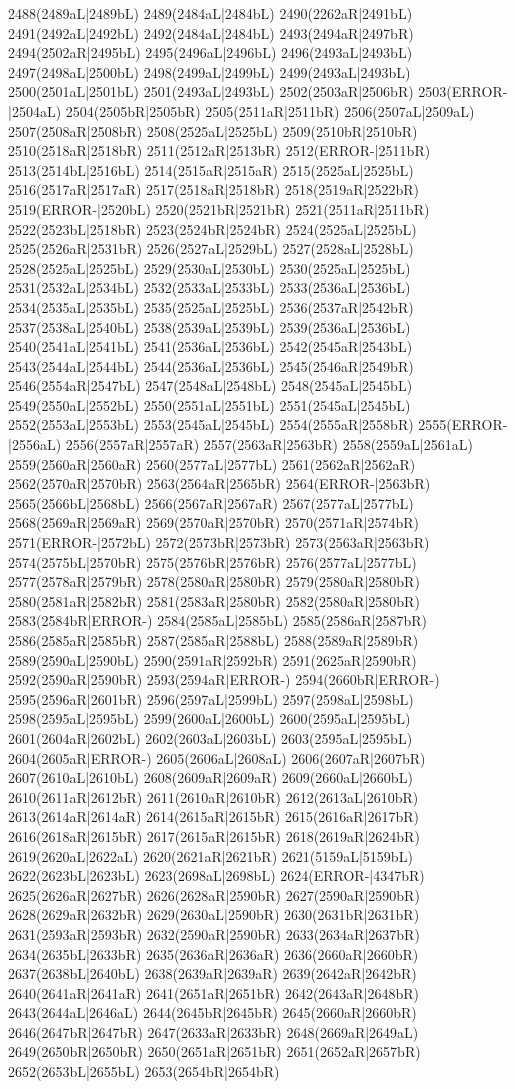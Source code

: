 2488(2489aL|2489bL) 2489(2484aL|2484bL) 2490(2262aR|2491bL) 2491(2492aL|2492bL) 2492(2484aL|2484bL) 2493(2494aR|2497bR) 2494(2502aR|2495bL) 2495(2496aL|2496bL) 2496(2493aL|2493bL) 2497(2498aL|2500bL) 2498(2499aL|2499bL) 2499(2493aL|2493bL) 2500(2501aL|2501bL) 2501(2493aL|2493bL) 2502(2503aR|2506bR) 2503(ERROR-|2504aL) 2504(2505bR|2505bR) 2505(2511aR|2511bR) 2506(2507aL|2509aL) 2507(2508aR|2508bR) 2508(2525aL|2525bL) 2509(2510bR|2510bR) 2510(2518aR|2518bR) 2511(2512aR|2513bR) 2512(ERROR-|2511bR) 2513(2514bL|2516bL) 2514(2515aR|2515aR) 2515(2525aL|2525bL) 2516(2517aR|2517aR) 2517(2518aR|2518bR) 2518(2519aR|2522bR) 2519(ERROR-|2520bL) 2520(2521bR|2521bR) 2521(2511aR|2511bR) 2522(2523bL|2518bR) 2523(2524bR|2524bR) 2524(2525aL|2525bL) 2525(2526aR|2531bR) 2526(2527aL|2529bL) 2527(2528aL|2528bL) 2528(2525aL|2525bL) 2529(2530aL|2530bL) 2530(2525aL|2525bL) 2531(2532aL|2534bL) 2532(2533aL|2533bL) 2533(2536aL|2536bL) 2534(2535aL|2535bL) 2535(2525aL|2525bL) 2536(2537aR|2542bR) 2537(2538aL|2540bL) 2538(2539aL|2539bL) 2539(2536aL|2536bL) 2540(2541aL|2541bL) 2541(2536aL|2536bL) 2542(2545aR|2543bL) 2543(2544aL|2544bL) 2544(2536aL|2536bL) 2545(2546aR|2549bR) 2546(2554aR|2547bL) 2547(2548aL|2548bL) 2548(2545aL|2545bL) 2549(2550aL|2552bL) 2550(2551aL|2551bL) 2551(2545aL|2545bL) 2552(2553aL|2553bL) 2553(2545aL|2545bL) 2554(2555aR|2558bR) 2555(ERROR-|2556aL) 2556(2557aR|2557aR) 2557(2563aR|2563bR) 2558(2559aL|2561aL) 2559(2560aR|2560aR) 2560(2577aL|2577bL) 2561(2562aR|2562aR) 2562(2570aR|2570bR) 2563(2564aR|2565bR) 2564(ERROR-|2563bR) 2565(2566bL|2568bL) 2566(2567aR|2567aR) 2567(2577aL|2577bL) 2568(2569aR|2569aR) 2569(2570aR|2570bR) 2570(2571aR|2574bR) 2571(ERROR-|2572bL) 2572(2573bR|2573bR) 2573(2563aR|2563bR) 2574(2575bL|2570bR) 2575(2576bR|2576bR) 2576(2577aL|2577bL) 2577(2578aR|2579bR) 2578(2580aR|2580bR) 2579(2580aR|2580bR) 2580(2581aR|2582bR) 2581(2583aR|2580bR) 2582(2580aR|2580bR) 2583(2584bR|ERROR-) 2584(2585aL|2585bL) 2585(2586aR|2587bR) 2586(2585aR|2585bR) 2587(2585aR|2588bL) 2588(2589aR|2589bR) 2589(2590aL|2590bL) 2590(2591aR|2592bR) 2591(2625aR|2590bR) 2592(2590aR|2590bR) 2593(2594aR|ERROR-) 2594(2660bR|ERROR-) 2595(2596aR|2601bR) 2596(2597aL|2599bL) 2597(2598aL|2598bL) 2598(2595aL|2595bL) 2599(2600aL|2600bL) 2600(2595aL|2595bL) 2601(2604aR|2602bL) 2602(2603aL|2603bL) 2603(2595aL|2595bL) 2604(2605aR|ERROR-) 2605(2606aL|2608aL) 2606(2607aR|2607bR) 2607(2610aL|2610bL) 2608(2609aR|2609aR) 2609(2660aL|2660bL) 2610(2611aR|2612bR) 2611(2610aR|2610bR) 2612(2613aL|2610bR) 2613(2614aR|2614aR) 2614(2615aR|2615bR) 2615(2616aR|2617bR) 2616(2618aR|2615bR) 2617(2615aR|2615bR) 2618(2619aR|2624bR) 2619(2620aL|2622aL) 2620(2621aR|2621bR) 2621(5159aL|5159bL) 2622(2623bL|2623bL) 2623(2698aL|2698bL) 2624(ERROR-|4347bR) 2625(2626aR|2627bR) 2626(2628aR|2590bR) 2627(2590aR|2590bR) 2628(2629aR|2632bR) 2629(2630aL|2590bR) 2630(2631bR|2631bR) 2631(2593aR|2593bR) 2632(2590aR|2590bR) 2633(2634aR|2637bR) 2634(2635bL|2633bR) 2635(2636aR|2636aR) 2636(2660aR|2660bR) 2637(2638bL|2640bL) 2638(2639aR|2639aR) 2639(2642aR|2642bR) 2640(2641aR|2641aR) 2641(2651aR|2651bR) 2642(2643aR|2648bR) 2643(2644aL|2646aL) 2644(2645bR|2645bR) 2645(2660aR|2660bR) 2646(2647bR|2647bR) 2647(2633aR|2633bR) 2648(2669aR|2649aL) 2649(2650bR|2650bR) 2650(2651aR|2651bR) 2651(2652aR|2657bR) 2652(2653bL|2655bL) 2653(2654bR|2654bR) 